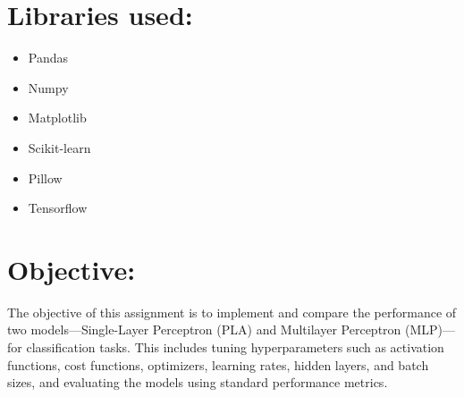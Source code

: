 \documentclass[11pt]{article}
\begin{document}
\section{Libraries used:}
\begin{itemize}
    \item {Pandas}
    \item {Numpy}
    \item {Matplotlib}
    \item {Scikit-learn}
    \item {Pillow}
    \item {Tensorflow}
\end{itemize}

\vspace{0.4cm}
\noindent
\section{Objective:} 
The objective of this assignment is to implement and compare the performance of two models—Single-Layer Perceptron (PLA) and Multilayer Perceptron (MLP)—for classification tasks. This includes tuning hyperparameters such as activation functions, cost functions, optimizers, learning rates, hidden layers, and batch sizes, and evaluating the models using standard performance metrics. 
\end{document}
